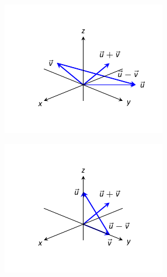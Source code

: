 \begin{Answer}
\Question
\begin{minipage}[m]{\linewidth}
\centering
\includegraphics[width=\linewidth/2]{vector_geometry/introduction_to_vectors_and_lines/figures/fig10_02_ex_14ans}
\end{minipage}
\Question
\begin{minipage}[m]{\linewidth}
\centering
\includegraphics[width=\linewidth/2]{vector_geometry/introduction_to_vectors_and_lines/figures/fig10_02_ex_15ans}
\end{minipage}
\end{Answer}
